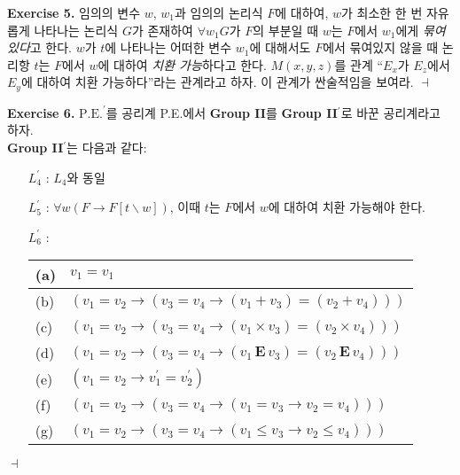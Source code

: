 \documentclass[12pt]{paper}
\newenvironment{context}[1][]
{ \noindent \textbf{{#1}.} }
{ \hfill $ \dashv $ }
\begin{document}
\begin{context}[Exercise 5]
임의의 변수 $w$, $w_1$과 임의의 논리식 $F$에 대하여,
$w$가 최소한 한 번 자유롭게 나타나는 논리식 $G$가 존재하여
$\forall w_1 G$가 $F$의 부분일 때
$w$는 $F$에서 $w_1$에게 \textit{묶여있다}고 한다.
$w$가 $t$에 나타나는 어떠한 변수 $w_1$에 대해서도 $F$에서 묶여있지 않을 때
논리항 $t$는 $F$에서 $w$에 대하여 \textit{치환 가능}하다고 한다.
$M \left( x , y , z \right)$를 관계 ``$E_x$가 $E_z$에서 $E_y$에 대하여 치환 가능하다''라는 관계라고 하자.
이 관계가 싼술적임을 보여라.
\end{context}

\begin{context}[Exercise 6]
$\mathrm{P.E.}^{\prime}$를 공리계 P.E.에서 \textbf{Group II}를 \textbf{Group II}$^{\prime}$로 바꾼 공리계라고 하자. \\
\textbf{Group II}$^{\prime}$는 다음과 같다:
\begin{enumerate}
\item [$L_4^{\prime}$]: $L_4$와 동일
\item [$L_5^{\prime}$]: $\forall w \left( F \rightarrow F \left[ t \backslash w \right] \right)$,
이때 $t$는 $F$에서 $w$에 대하여 치환 가능해야 한다.
\item [$L_6^{\prime}$]:
\begin{tabular}{|l|l|} \hline
(a) & $ v_1 = v_1 $ \\ \hline
(b) & $ \left( v_1 = v_2 \rightarrow \left( v_3 = v_4 \rightarrow \left( v_1 + v_3 \right) = \left( v_2 + v_4 \right) \right) \right)$ \\ \hline
(c) & $ \left( v_1 = v_2 \rightarrow \left( v_3 = v_4 \rightarrow \left( v_1 \times v_3 \right) = \left( v_2 \times v_4 \right) \right) \right)$ \\ \hline
(d) & $ \left( v_1 = v_2 \rightarrow \left( v_3 = v_4 \rightarrow \left( v_1 \, \mathbf{E} \, v_3 \right) = \left( v_2 \, \mathbf{E} \, v_4 \right) \right) \right)$ \\ \hline
(e) & $ \left( v_1 = v_2 \rightarrow v_1^{\prime} = v_2^{\prime} \right) $ \\ \hline
(f) & $ \left( v_1 = v_2 \rightarrow \left( v_3 = v_4 \rightarrow \left( v_1 = v_3 \rightarrow v_2 = v_4 \right) \right) \right) $ \\ \hline
(g) & $ \left( v_1 = v_2 \rightarrow \left( v_3 = v_4 \rightarrow \left( v_1 \le v_3 \rightarrow v_2 \le v_4 \right) \right) \right) $ \\ \hline
\end{tabular}
\end{enumerate}


\end{context}
\end{document}

